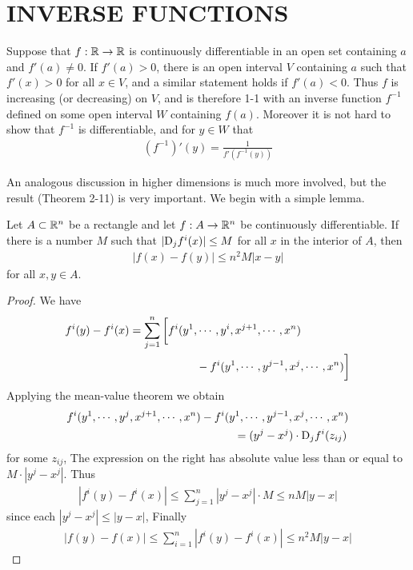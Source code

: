 \clearpage
\section{INVERSE FUNCTIONS} 
Suppose that $f:\mathbb{R}\to \mathbb{R}$ is continuously differentiable in an open set containing
$a$ and $f'(a)\neq 0$. If $f'(a)>0$, there is an open interval $V$ containing $a$ such that 
$f'(x)>0$ for all $x\in V$, and a similar statement holds if $f'(a)<0$. Thus $f$ is increasing
(or decreasing) on $V$, and is therefore 1-1 with an inverse function $f^{-1}$ defined on some 
open interval $W$ containing $f(a)$. Moreover it is not hard to show that $f^{-1}$ is differentiable,
and for $y\in W$ that 
\begin{align*}
    (f^{-1})'(y) = \frac{1}{f'(f^{-1}(y))}
\end{align*}

An analogous discussion in higher dimensions is much more
involved, but the result (Theorem 2-11) is very important.
We begin with a simple lemma.

\begin{lemma}
    Let $A\subset \mathbb{R}^n$ be a rectangle and let $f:A\to \mathbb{R}^n$ be continuously differentiable.
    If there is a number $M$ such that $|\mathrm{D}_jf^i(x)| \le M$ for all $x$ in the interior of $A$, then 
    \begin{align*}
        \left|f(x) - f(y)\right| \le n^2M\left|x-y\right|
    \end{align*}
    for all $x, y\in A$.
\end{lemma}

\begin{proof}
    We have 
    \begin{align*}
        f^i(y) - f^i(x)
        &  = \sum_{j=1}^{n}\bigg[ f^i(y^1, \cdots, y^i, x^{j+1}, \cdots, x^n)\\
        &  \hspace*{6em} - f^i(y^1, \cdots, y^{j-1}, x^j, \cdots, x^n)\bigg]
    \end{align*}
    Applying the mean-value theorem we obtain 
    \begin{align*}
        f^i(y^1, \cdots, y^j, x^{j+1}, \cdots, x^n) 
        & - f^i(y^1, \cdots, y^{j-1}, x^j, \cdots, x^n)\\
        & \hspace*{3em} = (y^j-x^j) \cdot \mathrm{D}_jf^i(z_{ij})
    \end{align*}
    for some $z_{ij}$, The expression on the right has absolute value less than or equal to $M\cdot |y^j-x^j|$. 
    Thus 
    \begin{align*}
        \left|f^i(y) - f^i(x)\right| 
        \le \sum_{j=1}^{n}{|y^j-x^j|\cdot M} 
        \le nM|y-x| 
    \end{align*}
    since each $|y^j - x^j| \le |y-x|$, Finally
    \begin{align*}
        |f(y) - f(x)| 
        \le \sum_{i=1}^{n}{|f^i(y) - f^i(x)|}
        \le n^2M|y-x| 
    \end{align*}
\end{proof}

